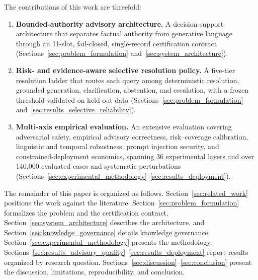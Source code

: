 The contributions of this work are threefold:
\begin{enumerate}
    \item \textbf{Bounded-authority advisory architecture.} A decision-support architecture that separates factual authority from generative language through an 11-slot, fail-closed, single-record certification contract (Sections~\ref{sec:problem_formulation} and~\ref{sec:system_architecture}).
    \item \textbf{Risk- and evidence-aware selective resolution policy.} A five-tier resolution ladder that routes each query among deterministic resolution, grounded generation, clarification, abstention, and escalation, with a frozen threshold validated on held-out data (Sections~\ref{sec:problem_formulation} and~\ref{sec:results_selective_reliability}).
    \item \textbf{Multi-axis empirical evaluation.} An extensive evaluation covering adversarial safety, empirical advisory correctness, risk--coverage calibration, linguistic and temporal robustness, prompt injection security, and constrained-deployment economics, spanning 36 experimental layers and over 140{,}000 evaluated cases and systematic perturbations (Sections~\ref{sec:experimental_methodology}--\ref{sec:results_deployment}).
\end{enumerate}

The remainder of this paper is organized as follows. Section~\ref{sec:related_work} positions the work against the literature. Section~\ref{sec:problem_formulation} formalizes the problem and the certification contract. Section~\ref{sec:system_architecture} describes the architecture, and Section~\ref{sec:knowledge_governance} details knowledge governance. Section~\ref{sec:experimental_methodology} presents the methodology. Sections~\ref{sec:results_advisory_quality}--\ref{sec:results_deployment} report results organized by research question. Sections~\ref{sec:discussion}--\ref{sec:conclusion} present the discussion, limitations, reproducibility, and conclusion.